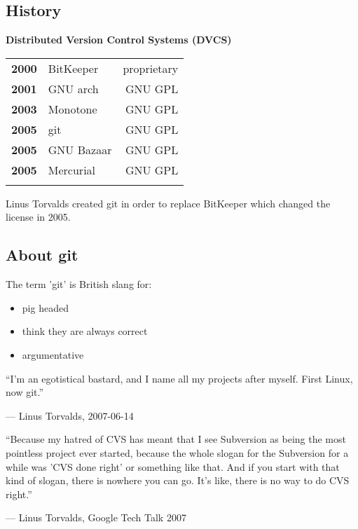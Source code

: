 \subsection{History}
\begin{frame}
  \subslidetitle
  \textbf{Distributed Version Control Systems (DVCS)}
  \pause
  \\
  \begin{tabular}{lp{5cm}r}
    \textbf{2000} & BitKeeper  & proprietary \\
    \pause
    \textbf{2001} & GNU arch   & GNU GPL \\
    \pause
    \textbf{2003} & Monotone   & GNU GPL \\
    \pause
    \textbf{2005} & git & GNU GPL \\
    \pause
    \textbf{2005} & GNU Bazaar & GNU GPL \\
    \pause
    \textbf{2005} & Mercurial  & GNU GPL \\
    \pause
  \end{tabular}

  Linus Torvalds created git in order to replace BitKeeper which changed the license in 2005.
\end{frame}

\subsection{About git}
\begin{frame}
  \subslidetitle
   The term 'git' is British slang for:
  \begin{itemize}
    \item pig headed
    \item think they are always correct
    \item argumentative
  \end{itemize}

  \pause
  \epigraph{``I'm an egotistical bastard, and I name all my projects after myself. First Linux, now git.''}
       {--- Linus Torvalds, 2007-06-14}
  \pause
  \epigraph{``Because my hatred of CVS has meant that I see Subversion as being the most pointless project ever started, because the whole slogan for the Subversion for a while was 'CVS done right' or something like that. And if you start with that kind of slogan, there is nowhere you can go. It's like, there is no way to do CVS right.''}
      {--- Linus Torvalds, Google Tech Talk 2007}
\end{frame}

